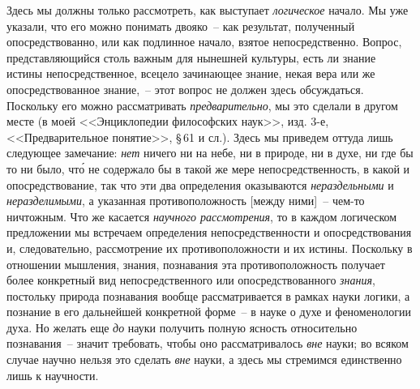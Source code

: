 
Здесь мы должны только рассмотреть, как выступает
\emph{логическое} начало. Мы уже указали, что его можно понимать
двояко~-- как результат, полученный опосредствованно,
или как подлинное начало, взятое непосредственно.
Вопрос, представляющийся столь важным для
нынешней культуры, есть ли знание истины непосредственное,
всецело зачинающее знание, некая вера или
же опосредствованное знание,~-- этот вопрос не должен
здесь обсуждаться. Поскольку его можно рассматривать
\emph{предварительно}, мы это сделали в другом месте (в моей
<<Энциклопедии философских наук>>, изд. 3-е, <<Предварительное
понятие>>, \S\,61 и сл.). Здесь мы приведем оттуда
лишь следующее замечание: \emph{нет} ничего ни на небе,
ни в природе, ни в духе, ни где бы то ни было, чт\'о не
содержало бы в такой же мере непосредственность, в какой
и опосредствование, так что эти два определения
оказываются \emph{нераздельными} и \emph{неразделимыми}, а указанная
противоположность [между ними]~-- чем-то ничтожным.
Что же касается \emph{научного рассмотрения}, то в каждом
логическом предложении мы встречаем определения
непосредственности и опосредствования и, следовательно,
рассмотрение их противоположности и их истины. Поскольку
в отношении мышления, знания, познавания эта
противоположность получает более конкретный вид непосредственного
или опосредствованного \emph{знания}, постольку
природа познавания вообще рассматривается в рамках
науки логики, а познание в его дальнейшей конкретной
форме~-- в науке о духе и феноменологии духа.
Но желать еще \emph{до} науки получить полную ясность относительно
познавания~-- значит требовать, чтобы оно
рассматривалось \emph{вне} науки; во всяком случае научно
нельзя это сделать \emph{вне} науки, а здесь мы стремимся единственно
лишь к научности.

